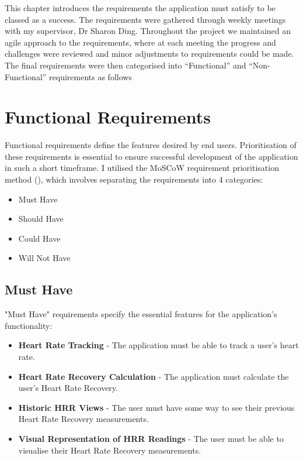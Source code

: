 \documentclass{l4proj}
\begin{document}
This chapter introduces the requirements the application must satisfy to be classed as a success. The requirements were gathered through weekly meetings with my supervisor, Dr Sharon Ding. Throughout the project we maintained an agile approach to the requirements, where at each meeting the progress and challenges were reviewed and minor adjustments to requirements could be made. The final requirements were then categorised into “Functional” and “Non-Functional” requirements as follows

\section{Functional Requirements}
\label{sec:functionalreqs}

Functional requirements define the features desired by end users. Prioritisation of these requirements is essential to ensure successful development of the application in such a short timeframe. I utilised the MoSCoW requirement prioritisation method (\cite{Brush_2023}), which involves separating the requirements into 4 categories:

\begin{itemize}
    \item Must Have 
    \item Should Have
    \item Could Have
    \item Will Not Have
\end{itemize}

\subsection{Must Have}
\label{sec:musthave}

"Must Have" requirements specify the essential features for the application's functionality:

\begin{itemize}
    \item \textbf{Heart Rate Tracking} - The application must be able to track a user's heart rate.
    \item \textbf{Heart Rate Recovery Calculation} - The application must calculate the user's Heart Rate Recovery.
    \item \textbf{Historic HRR Views} - The user must have some way to see their previous Heart Rate Recovery measurements.
    \item \textbf{Visual Representation of HRR Readings} - The user must be able to visualise their Heart Rate Recovery measurements.
\end{itemize}
\end{document}
